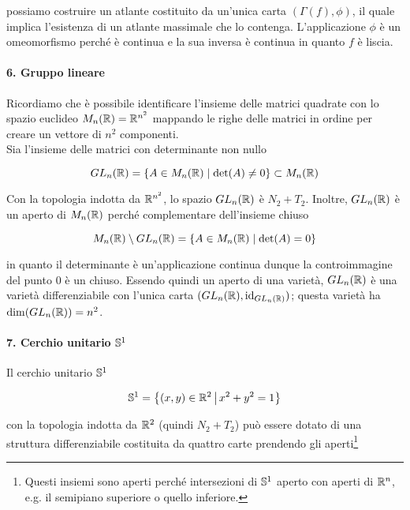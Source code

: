 possiamo costruire un atlante costituito da un'unica carta $ (\Gamma(f),\phi) $, il quale implica l'esistenza di un atlante massimale che lo contenga. L'applicazione $ \phi $ è un omeomorfismo perché è continua e la sua inversa è continua in quanto $ f $ è liscia.

\paragraph{6. Gruppo lineare}

Ricordiamo che è possibile identificare l'insieme delle matrici quadrate con lo spazio euclideo $ M_{n}(\R) = \R^{n^{2}} $ mappando le righe delle matrici in ordine per creare un vettore di $ n^{2} $ componenti.\\
Sia l'insieme delle matrici con determinante non nullo

\begin{equation}
	GL_{n}(\R) = \{ A \in M_{n}(\R) \mid \det(A) \neq 0 \} \subset M_{n}(\R)
\end{equation}

Con la topologia indotta da $ \R^{n^{2}} $, lo spazio $ GL_{n}(\R) $ è $ N_{2}+T_{2} $. Inoltre, $ GL_{n}(\R) $ è un aperto di $ M_{n}(\R) $ perché complementare dell'insieme chiuso

\begin{equation}
	 M_{n}(\R) \setminus GL_{n}(\R) = \{ A \in M_{n}(\R) \mid \det(A) = 0 \}
\end{equation}

in quanto il determinante è un'applicazione continua dunque la controimmagine del punto $ 0 $ è un chiuso. Essendo quindi un aperto di una varietà, $ GL_{n}(\R) $ è una varietà differenziabile con l'unica carta $ (GL_{n}(\R),\id_{GL_{n}(\R)}) $; questa varietà ha $ \dim(GL_{n}(\R)) = n^{2} $.

\paragraph{7. Cerchio unitario $ \S^{1} $}\label{ex-s1}

Il cerchio unitario $ \S^{1} $

\begin{equation}
	\S^{1} = \left\{ (x,y) \in \R^{2} \st x^{2} + y^{2} = 1 \right\}
\end{equation}

con la topologia indotta da $ \R^{2} $ (quindi $ N_{2}+T_{2} $) può essere dotato di una struttura differenziabile costituita da quattro carte prendendo gli aperti\footnote{%
	Questi insiemi sono aperti perché intersezioni di $ \S^{1} $ aperto con aperti di $ \R^{n} $, e.g. il semipiano superiore o quello inferiore.}

